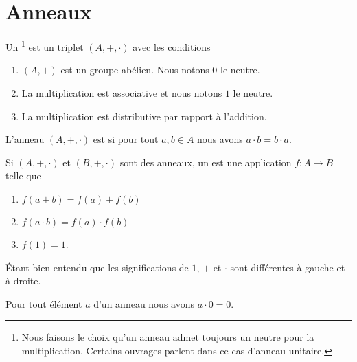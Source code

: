 \section{Anneaux}

\begin{definition}     \label{DefHXJUooKoovob}
    Un \footnote{Nous faisons le choix qu'un anneau admet toujours un neutre pour la multiplication. Certains ouvrages parlent dans ce cas d'anneau unitaire.} est un triplet \( (A,+,\cdot)\) avec les conditions
    \begin{enumerate}
        \item
            \( (A,+)\) est un groupe abélien. Nous notons \( 0\) le neutre.
        \item
            La multiplication est associative et nous notons \( 1\) le neutre.
        \item
            La multiplication est distributive par rapport à l'addition.
    \end{enumerate}
    L'anneau \( (A,+,\cdot)\) est  si pour tout \( a,b\in A\) nous avons \( a\cdot b=b\cdot a\).
\end{definition}

\begin{definition}      \label{DEFooSPHPooCwjzuz}
    Si \( (A,+,\cdot)\) et \( (B,+,\cdot)\) sont des anneaux, un  est une application \( f\colon A\to B\) telle que
    \begin{enumerate}
        \item \( f(a+b)=f(a)+f(b)\)
        \item
            \( f(a\cdot b)=f(a)\cdot f(b)\)
        \item
            \( f(1)=1\).
    \end{enumerate}
    Étant bien entendu que les significations de \( 1\), $+$ et \( \cdot\) sont différentes à gauche et à droite.
\end{definition}

\begin{lemma}       \label{LEMooVUSMooWisQpD}
    Pour tout élément \( a\) d'un anneau nous avons \( a\cdot 0=0\).
\end{lemma}


